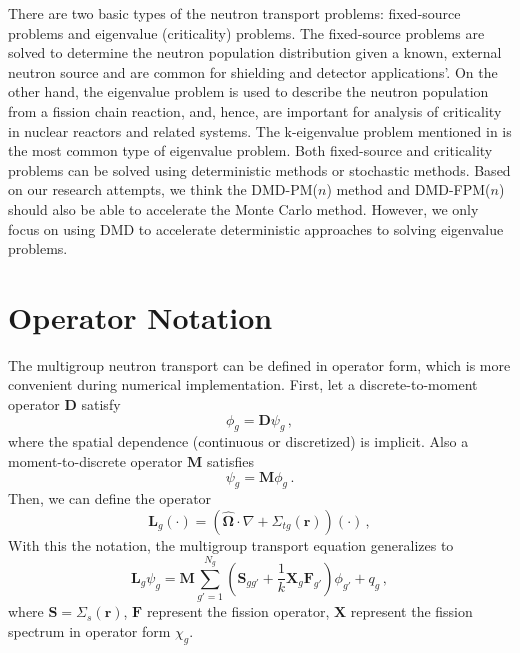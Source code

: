 There are two basic types of the neutron transport problems: fixed-source problems and eigenvalue (criticality) problems.  
The fixed-source problems are solved to determine the neutron population distribution given a known, external neutron source and are common for shielding and detector applications'.
On the other hand, the eigenvalue problem is used to describe the neutron population from a fission chain reaction, and, hence, are important for analysis of criticality in nuclear reactors and related systems.
The k-eigenvalue problem mentioned in  is the most common type of eigenvalue problem.
Both fixed-source and criticality problems can be solved using deterministic methods or stochastic methods.
Based on our research attempts, we think the DMD-PM($n$) method and DMD-FPM($n$) should also be able to accelerate the Monte Carlo method. 
However, we only focus on using DMD to accelerate deterministic approaches to solving eigenvalue problems.

\section{Operator Notation}
The multigroup neutron transport  can be defined in operator form, which is more convenient during numerical implementation. 
First, let a discrete-to-moment operator $\mathbf{D}$ satisfy
\begin{equation}
 \phi_g = \mathbf{D} \psi_g  \, ,
 \label{eq:operatorD}
\end{equation}
where the spatial dependence (continuous or discretized) is implicit. Also a moment-to-discrete operator $\mathbf{M}$ satisfies
\begin{equation}
 \psi_g = \mathbf{M} \phi_g  \, .
 \label{eq:operatorM}
\end{equation}
Then, we can define the operator 
\begin{equation}
 \mathbf{L}_g(\cdot) = (\bm{\hat{\Omega}} \cdot \nabla + \Sigma_{tg}(\mathbf{r}))(\cdot) \, ,
 \label{eq:operatorL}
\end{equation}
With this the notation, the multigroup transport equation generalizes to \cite{slaybaugh_multigrid_2013}
\begin{equation}
\mathbf{L}_g \psi_g = \mathbf{M} \sum\limits^{N_g}_{g'=1} (\mathbf{S}_{gg'} + \frac{1}{k} \mathbf{X}_g \mathbf{F}_{g'}) \phi_{g'} +q_g   \, ,
 \label{eq:operator_transport}
\end{equation}
where $\mathbf{S} = \Sigma_s(\mathbf{r})$, $\mathbf{F}$ represent the fission operator, $\mathbf{X}$ represent the fission spectrum in operator form $\chi_g$. 

